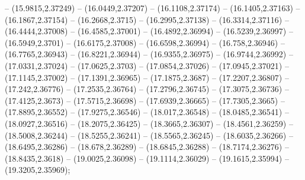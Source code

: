 {-- (15.9815,2.37249) -- (16.0449,2.37207) -- (16.1108,2.37174) -- (16.1405,2.37163) -- (16.1867,2.37154) -- (16.2668,2.3715) -- (16.2995,2.37138) -- (16.3314,2.37116) -- (16.4444,2.37008) -- (16.4585,2.37001) -- (16.4892,2.36994) --
(16.5239,2.36997) -- (16.5949,2.3701) -- (16.6175,2.37008) -- (16.6598,2.36994) -- (16.758,2.36946) -- (16.7765,2.36943) -- (16.8221,2.36944) -- (16.9355,2.36975) -- (16.9744,2.36992) -- (17.0331,2.37024) -- (17.0625,2.3703) -- (17.0854,2.37026) --
(17.0945,2.37021) -- (17.1145,2.37002) -- (17.1391,2.36965) -- (17.1875,2.3687) -- (17.2207,2.36807) -- (17.242,2.36776) -- (17.2535,2.36764) -- (17.2796,2.36745) -- (17.3075,2.36736) -- (17.4125,2.3673) -- (17.5715,2.36698) -- (17.6939,2.36665) --
(17.7305,2.3665) -- (17.8895,2.36552) -- (17.9275,2.36546) -- (18.017,2.36548) -- (18.0485,2.36541) -- (18.0927,2.36516) -- (18.2075,2.36425) -- (18.3665,2.36307) -- (18.4561,2.36259) -- (18.5008,2.36244) -- (18.5255,2.36241) -- (18.5565,2.36245) --
(18.6035,2.36266) -- (18.6495,2.36286) -- (18.678,2.36289) -- (18.6845,2.36288) -- (18.7174,2.36276) -- (18.8435,2.3618) -- (19.0025,2.36098) -- (19.1114,2.36029) -- (19.1615,2.35994) -- (19.3205,2.35969);

}{

}
